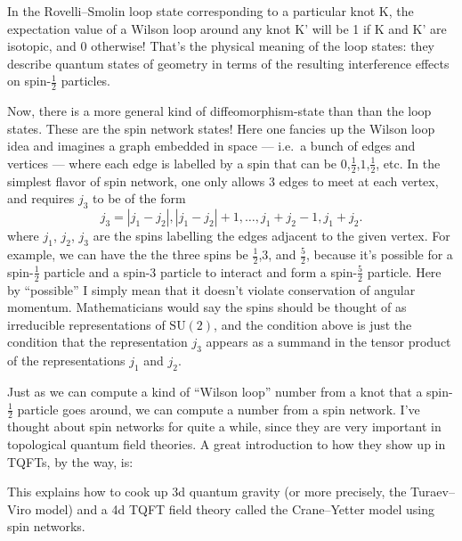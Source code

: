 \documentclass{article}
\def\tightlist{}
\renewcommand{\texttt}[1]{%
  \begingroup
  \ttfamily
  \begingroup\lccode`~=`/\lowercase{\endgroup\def~}{/\discretionary{}{}{}}%
  \begingroup\lccode`~=`[\lowercase{\endgroup\def~}{[\discretionary{}{}{}}%
  \begingroup\lccode`~=`.\lowercase{\endgroup\def~}{.\discretionary{}{}{}}%
  \catcode`/=\active\catcode`[=\active\catcode`.=\active
  \scantokens{#1\noexpand}%
  \endgroup
}
\begin{document}
In the Rovelli--Smolin loop state corresponding to a particular knot
K, the expectation value of a Wilson loop around any knot K' will be 1
if K and K' are isotopic, and 0 otherwise! That's the physical meaning
of the loop states: they describe quantum states of geometry in terms of
the resulting interference effects on spin-\(\frac12\) particles.

Now, there is a more general kind of diffeomorphism-state than than the
loop states. These are the spin network states! Here one fancies up the
Wilson loop idea and imagines a graph embedded in space --- i.e.~a bunch
of edges and vertices --- where each edge is labelled by a spin that can
be \(0\),\(\frac{1}{2}\),\(1\),\(\frac{1}{2}\), etc. In the simplest flavor of spin
network, one only allows 3 edges to meet at each vertex, and requires
\(j_3\) to be of the form
\[j_3 = |j_1-j_2|, |j_1-j_2| + 1, \ldots, j_1+j_2-1, j_1+j_2.\] where
\(j_1\), \(j_2\), \(j_3\) are the spins labelling the edges adjacent to
the given vertex. For example, we can have the the three spins be
\(\frac{1}{2}\),\(3\), and \(\frac{5}{2}\), because it's possible for a spin-\(\frac12\)
particle and a spin-3 particle to interact and form a spin-\(\frac{5}{2}\)
particle. Here by ``possible'' I simply mean that it doesn't violate
conservation of angular momentum. Mathematicians would say the spins
should be thought of as irreducible representations of
\(\mathrm{SU}(2)\), and the condition above is just the condition that
the representation \(j_3\) appears as a summand in the tensor product of
the representations \(j_1\) and \(j_2\).

Just as we can compute a kind of ``Wilson loop'' number from a knot that
a spin-\(\frac12\) particle goes around, we can compute a number from a
spin network. I've thought about spin networks for quite a while, since
they are very important in topological quantum field theories. A great
introduction to how they show up in TQFTs, by the way, is:

\noindent
This explains how to cook up 3d quantum gravity (or more precisely, the
Turaev--Viro model) and a 4d TQFT field theory called the Crane--Yetter
model using spin networks.
\end{document}
